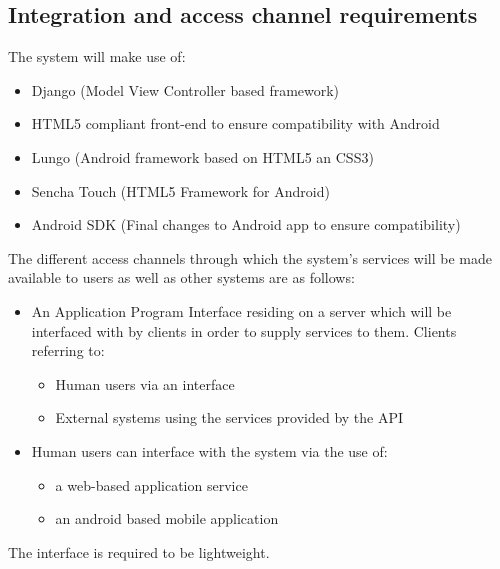 \documentclass{article}
\begin{document}
	\subsection{Integration and access channel requirements}\label{subsec:integration}
		The system will make use of:
			\begin{itemize}
				\item Django (Model View Controller based framework)
				\item HTML5 compliant front-end to ensure compatibility with Android
				\item Lungo (Android framework based on HTML5 an CSS3)
				\item Sencha Touch (HTML5 Framework for Android)
				\item Android SDK (Final changes to Android app to ensure compatibility)
			\end{itemize}
			
			The different access channels through which the system's services will be made available to users as well as other systems are as follows:
			\begin{itemize}
				\item An Application Program Interface residing on a server which will be interfaced with by clients in order to supply services to them. Clients referring to:
				\begin{itemize}
					\item Human users via an interface
					\item External systems using the services provided by the API
				\end{itemize}
				\item Human users can interface with the system via the use of:
				\begin{itemize}
					\item a web-based application service
					\item an android based mobile application
				\end{itemize}
			\end{itemize}
			The interface is required to be lightweight.
\end{document}
